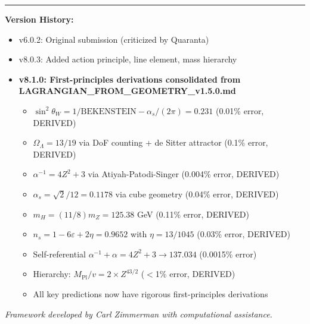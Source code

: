 \documentclass[12pt,a4paper]{article}
\newcommand{\OmegaL}{\Omega_\Lambda}
\newcommand{\sinW}{\sin^2\theta_W}
\newcommand{\Zsq}{Z^2}
\newcommand{\BEKENSTEIN}{\text{BEKENSTEIN}}
\begin{document}
\vspace{2em}
\noindent\rule{\textwidth}{0.5pt}

\textbf{Version History:}
\begin{itemize}[itemsep=0pt]
    \item v6.0.2: Original submission (criticized by Quaranta)
    \item v8.0.3: Added action principle, line element, mass hierarchy
    \item \textbf{v8.1.0: First-principles derivations consolidated from LAGRANGIAN\_FROM\_GEOMETRY\_v1.5.0.md}
    \begin{itemize}[itemsep=0pt]
        \item $\sinW = 1/\BEKENSTEIN - \alpha_s/(2\pi) = 0.231$ (0.01\% error, DERIVED)
        \item $\OmegaL = 13/19$ via DoF counting + de Sitter attractor (0.1\% error, DERIVED)
        \item $\alpha^{-1} = 4\Zsq + 3$ via Atiyah-Patodi-Singer (0.004\% error, DERIVED)
        \item $\alpha_s = \sqrt{2}/12 = 0.1178$ via cube geometry (0.04\% error, DERIVED)
        \item $m_H = (11/8)m_Z = 125.38$ GeV (0.11\% error, DERIVED)
        \item $n_s = 1 - 6\varepsilon + 2\eta = 0.9652$ with $\eta = 13/1045$ (0.03\% error, DERIVED)
        \item Self-referential $\alpha^{-1} + \alpha = 4\Zsq + 3 \to 137.034$ (0.0015\% error)
        \item Hierarchy: $M_{\text{Pl}}/v = 2 \times Z^{43/2}$ ($<$1\% error, DERIVED)
        \item All key predictions now have rigorous first-principles derivations
    \end{itemize}
\end{itemize}

\vspace{1em}
\textit{Framework developed by Carl Zimmerman with computational assistance.}
\end{document}
